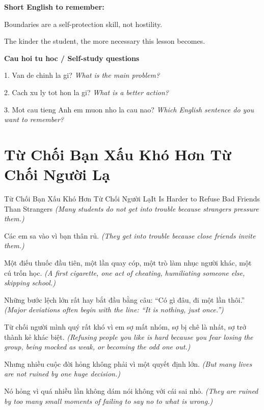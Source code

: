 \begin{ghinhoanh}
\textbf{Short English to remember:}

Boundaries are a self-protection skill, not hostility.

The kinder the student, the more necessary this lesson becomes.

\end{ghinhoanh}

\begin{tuhocnhanh}
\textbf{Cau hoi tu hoc / Self-study questions}

1. Van de chinh la gi? \textit{What is the main problem?}

2. Cach xu ly tot hon la gi? \textit{What is a better action?}

3. Mot cau tieng Anh em muon nho la cau nao? \textit{Which English sentence do you want to remember?}
\end{tuhocnhanh}
\ngancach

\section{Từ Chối Bạn Xấu Khó Hơn Từ Chối Người Lạ}
\begin{truyen}{Từ Chối Bạn Xấu Khó Hơn Từ Chối Người Lạ}{It Is Harder to Refuse Bad Friends Than Strangers}
\textit{(Many students do not get into trouble because strangers pressure them.)}

Các em sa vào vì bạn thân rủ.
\textit{(They get into trouble because close friends invite them.)}

Một điếu thuốc đầu tiên, một lần quay cóp, một trò làm nhục người khác, một cú trốn học.
\textit{(A first cigarette, one act of cheating, humiliating someone else, skipping school.)}

Những bước lệch lớn rất hay bắt đầu bằng câu: ``Có gì đâu, đi một lần thôi.''
\textit{(Major deviations often begin with the line: ``It is nothing, just once.'')}

Từ chối người mình quý rất khó vì em sợ mất nhóm, sợ bị chê là nhát, sợ trở thành kẻ khác biệt.
\textit{(Refusing people you like is hard because you fear losing the group, being mocked as weak, or becoming the odd one out.)}

Nhưng nhiều cuộc đời hỏng không phải vì một quyết định lớn.
\textit{(But many lives are not ruined by one huge decision.)}

Nó hỏng vì quá nhiều lần không dám nói không với cái sai nhỏ.
\textit{(They are ruined by too many small moments of failing to say no to what is wrong.)}

\end{truyen}

